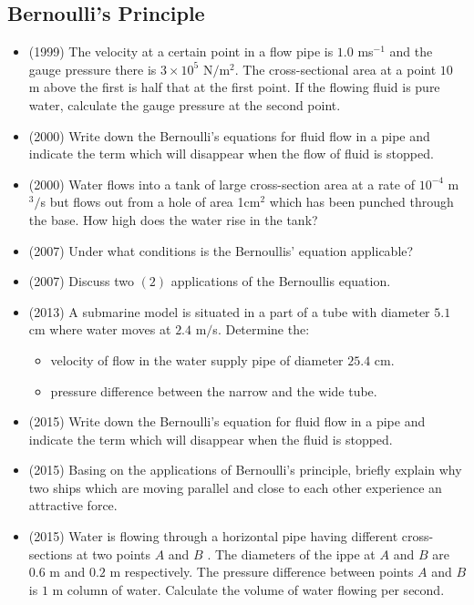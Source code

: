 \documentclass{article}
\begin{document}
\subsection{Bernoulli's Principle}
\begin{itemize}
\item (1999)  The velocity at a certain point in a flow pipe is $ 1.0$ ms$ ^{-1}$ and the gauge pressure there is $ 3 \times 10^5 $ N$/$m$ ^{2}$ ​ . The cross-sectional area at a point $ 10$ m above the first is half that at the first point. If the flowing fluid is pure water, calculate the gauge pressure at the second point.
\item (2000)  Write down the Bernoulli's equations for fluid flow in a pipe and indicate the term which will disappear when the flow of fluid is stopped.
\item (2000)  Water flows into a tank of large cross-section area at a rate of $ 10^{-4}$ m$ ^{3}/$s but flows out from a  hole of area 1cm$ ^{2}$ which has been punched through the base. How high does the water rise in the tank?
\item (2007)  Under what conditions is the Bernoullis’ equation applicable?
\item (2007)  Discuss two $ (2)$ applications of the Bernoullis equation. 
\item (2013)  A submarine model is situated in a part of a tube with diameter $ 5.1$ cm where water moves at $ 2.4$ m$/$s.  Determine the:
 \begin{itemize}
\item velocity of flow in the water supply pipe of diameter $ 25.4$ cm. 
\item pressure difference between the narrow and the wide tube. 
\end{itemize}
\item (2015)  Write down the Bernoulli’s equation for fluid flow in a pipe and indicate the term which will disappear when the fluid is stopped.
\item (2015)  Basing on the applications of Bernoulli’s principle, briefly explain why two ships which are moving parallel and close to each other experience an attractive force.
\item (2015)  Water is flowing through a horizontal pipe having different cross-sections at two points $ A$ and $ B$ .  The diameters of the ippe at $ A$ and $ B$ are $ 0.6$ m and $ 0.2$ m respectively.   The pressure difference between points $ A$ and $ B$ is $ 1$ m column of water.  Calculate the volume of water flowing per second.

\end{itemize}
\end{document}
